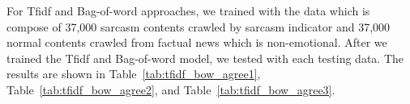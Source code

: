 \documentclass[12pt,a4paper]{report}
\theoremstyle{definition}
\begin{document}
\begin{CJK}{UTF8}{bsmi}
        \par For Tfidf and Bag-of-word approaches, we trained with the data which is compose of 37,000 sarcasm contents crawled by sarcasm indicator and 37,000 normal contents crawled from factual news which is non-emotional.
        After we trained the Tfidf and Bag-of-word model, we tested with each testing data. 
        The results are shown in Table~\ref{tab:tfidf_bow_agree1}, Table~\ref{tab:tfidf_bow_agree2}, and Table~\ref{tab:tfidf_bow_agree3}.
    

        
        
        
        

\end{CJK}
\end{document}
